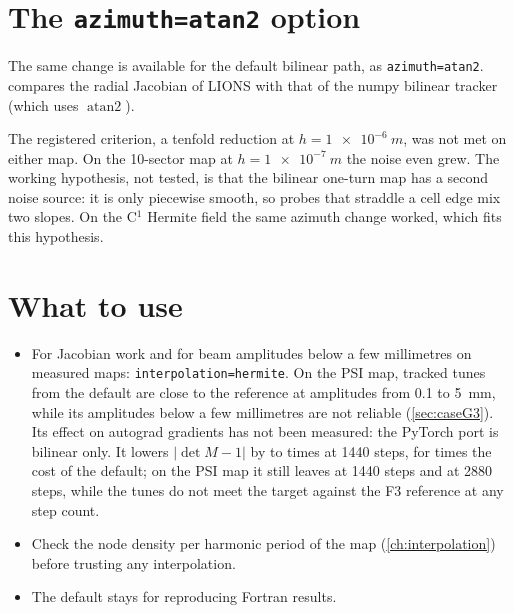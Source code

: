 \section{The \texttt{azimuth=atan2} option}
The same change is available for the default bilinear path, as \texttt{azimuth=atan2}.
 compares the radial Jacobian of LIONS with that of the numpy bilinear tracker (which uses
$\operatorname{atan2}$).

\begin{table}[h]
\centering\small
\caption{Maximum $|\Delta M_{rr}|$ between LIONS bilinear and the numpy bilinear tracker, for three Jacobian steps.}
\label{tab:Hazimuth}

\end{table}

The registered criterion, a tenfold reduction at $h = \SI{1e-6}{m}$, was not met on either map.
On the 10-sector map at $h = \SI{1e-7}{m}$ the noise even grew.
The working hypothesis, not tested, is that the bilinear one-turn map has a second noise source: it is only piecewise
smooth, so probes that straddle a cell edge mix two slopes.
On the C$^1$ Hermite field the same azimuth change worked, which fits this hypothesis.

\section{What to use}
\begin{itemize}
\item For Jacobian work and for beam amplitudes below a few millimetres on measured maps: \texttt{interpolation=hermite}.
On the PSI map, tracked tunes from the default are close to the reference at amplitudes from \num{0.1} to \SI{5}{mm}, while its amplitudes below a few millimetres are not reliable (\cref{sec:caseG3}).
Its effect on autograd gradients has not been measured: the PyTorch port is bilinear only.
It lowers $|\det M-1|$ by \HDetRatioMin{} to \HDetRatioMax{} times at 1440 steps, for \HCostHerm{} times the cost of
the default; on the PSI map it still leaves \HFoneDetPsi{} at 1440 steps and \HFoneDetPsiTwoEightEighty{} at 2880 steps, while the
tunes do not meet the target against the F3 reference at any step count.
\item Check the node density per harmonic period of the map (\cref{ch:interpolation}) before trusting any interpolation.
\item The default stays for reproducing Fortran results.
\end{itemize}
